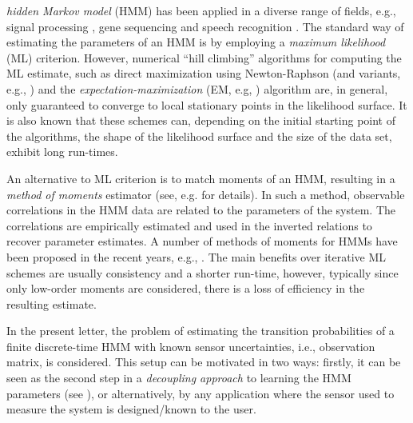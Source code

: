 \documentclass[journal]{IEEEtran}
\begin{document}
 \emph{hidden Markov model} (HMM) has been applied in a diverse range
of fields, e.g., signal processing \cite{krishnamurthy_partially_2016}, gene sequencing
\cite{durbin_biological_1998, vidyasagar_hidden_2014} and speech recognition
\cite{rabiner_tutorial_1989}. The standard way of estimating the parameters of an HMM is
by employing a \emph{maximum likelihood} (ML) criterion. However, numerical ``hill
climbing'' algorithms for computing the ML estimate, such as direct maximization using
Newton-Raphson (and variants, e.g., \cite{cappe_inference_2005}) and the
\emph{expectation-maximization} (EM, e.g, \cite{dempster_maximum_1977,
rabiner_tutorial_1989}) algorithm are, in general, only guaranteed to converge to local
stationary points in the likelihood surface.  It is also known that these schemes can,
depending on the initial starting point of the algorithms, the shape of the likelihood
surface and the size of the data set, exhibit long run-times.


An alternative to ML criterion is to match moments of an HMM, resulting in a \emph{method
of moments} estimator (see, e.g. \cite{kay_fundamentals_1993} for details). In such
a method, observable correlations in the HMM data are related to the parameters of the
system. The correlations are empirically estimated and used in the inverted relations to
recover parameter estimates. A number of methods of moments for HMMs have been proposed in
the recent years, e.g., \cite{lakshminarayanan_non-negative_2010, anandkumar_method_2012,
    hsu_spectral_2012, kontorovich_learning_2013, anandkumar_tensor_2014,
mattila_recursive_2015, subakan_method_2015}. The main benefits over iterative ML schemes
are usually consistency and a shorter run-time, however, typically since only low-order
moments are considered, there is a loss of efficiency in the resulting estimate.

In the present letter, the problem of estimating the transition probabilities of
a finite discrete-time HMM with known sensor uncertainties, i.e., observation
matrix, is considered. This setup can be motivated in two ways: firstly, it can
be seen as the second step in a \emph{decoupling approach} to learning the HMM
parameters (see \cite{kontorovich_learning_2013}), or alternatively, by any
application where the sensor used to measure the system is designed/known to
the user. 
\end{document}

